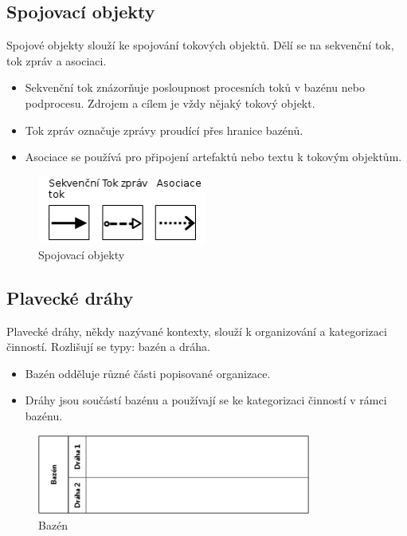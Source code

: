 \documentclass{fithesis}
\begin{document}
\subsection{Spojovací objekty}
Spojové objekty slouží ke spojování tokových objektů. Dělí se na sekvenční tok, tok zpráv a asociaci.

\begin{itemize}
\item Sekvenční tok znázorňuje posloupnost procesních toků v bazénu nebo podprocesu. Zdrojem a cílem je vždy nějaký tokový objekt. 
\item Tok zpráv označuje zprávy proudící přes hranice bazénů.
\item Asociace se používá pro připojení artefaktů nebo textu k tokovým objektům.
\end{itemize}

\begin{figure}[htp]
\centering
\includegraphics[width=210px]{images/spojovaci_objekty.png}
\caption{Spojovací objekty}
\end{figure}


\subsection{Plavecké dráhy}
Plavecké dráhy, někdy nazývané kontexty, slouží k organizování a kategorizaci činností. Rozlišují se typy: bazén a dráha.

\begin{itemize}
\item Bazén odděluje různé části popisované organizace.
\item Dráhy jsou součástí bazénu a používají se ke kategorizaci činností v rámci bazénu.
\end{itemize}

\begin{figure}[htp]
\centering
\includegraphics[width=340px]{images/bazen.png}
\caption{Bazén}
\end{figure}
\end{document}
